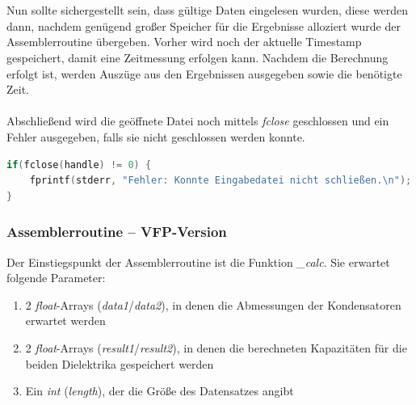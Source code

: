 \documentclass[11pt]{scrartcl}
\begin{document}
\\\\
Nun sollte sichergestellt sein, dass gültige Daten eingelesen wurden, diese werden dann, nachdem genügend großer Speicher für die Ergebnisse alloziert wurde der Assemblerroutine übergeben. Vorher wird noch der aktuelle Timestamp gespeichert, damit eine Zeitmessung erfolgen kann. Nachdem die Berechnung erfolgt ist, werden Auszüge aus den Ergebnissen ausgegeben sowie die benötigte Zeit.
\\\\
Abschließend wird die geöffnete Datei noch mittels \emph{fclose} geschlossen und ein Fehler ausgegeben, falls sie nicht geschlossen werden konnte.
\begin{lstlisting}[language=C]
if(fclose(handle) != 0) {
	fprintf(stderr, "Fehler: Konnte Eingabedatei nicht schließen.\n");
}
\end{lstlisting}

\subsubsection{Assemblerroutine -- VFP-Version}
Der Einstiegspunkt der Assemblerroutine ist die Funktion \emph{\_calc}. Sie erwartet folgende Parameter:
\begin{enumerate}
\item 2 \emph{float}-Arrays (\emph{data1}/\emph{data2}), in denen die Abmessungen der Kondensatoren erwartet werden
\item 2 \emph{float}-Arrays (\emph{result1}/\emph{result2}), in denen die berechneten Kapazitäten für die beiden Dielektrika gespeichert werden
\item Ein \emph{int} (\emph{length}), der die Größe des Datensatzes angibt
\end{enumerate}
\end{document}

